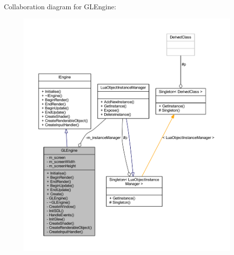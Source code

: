 Collaboration diagram for G\+L\+Engine\+:\nopagebreak
\begin{figure}[H]
\begin{center}
\leavevmode
\includegraphics[width=350pt]{class_g_l_engine__coll__graph}
\end{center}
\end{figure}
